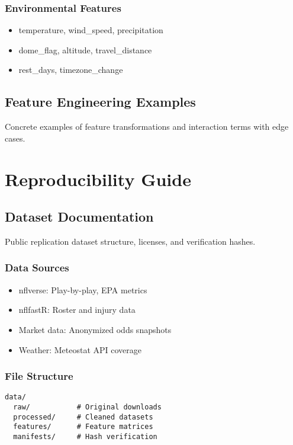 \subsection{Environmental Features}
\begin{itemize}
  \item temperature, wind\_speed, precipitation
  \item dome\_flag, altitude, travel\_distance
  \item rest\_days, timezone\_change
\end{itemize}

\section{Feature Engineering Examples}
Concrete examples of feature transformations and interaction terms with edge cases.

\chapter{Reproducibility Guide}

\section{Dataset Documentation}
Public replication dataset structure, licenses, and verification hashes.

\subsection{Data Sources}
\begin{itemize}
  \item nflverse: Play-by-play, EPA metrics
  \item nflfastR: Roster and injury data
  \item Market data: Anonymized odds snapshots
  \item Weather: Meteostat API coverage
\end{itemize}

\subsection{File Structure}
\begin{verbatim}
data/
  raw/           # Original downloads
  processed/     # Cleaned datasets
  features/      # Feature matrices
  manifests/     # Hash verification
\end{verbatim}


